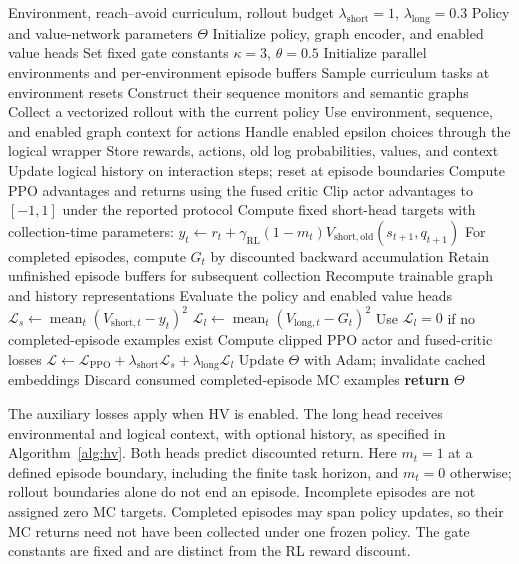 \documentclass[journal]{IEEEtran}
\begin{document}
\begin{algorithm}[t]
\caption{HiLTL Training with TD/MC Value Supervision}
\label{alg:training}
\begin{algorithmic}[1]
\REQUIRE Environment, reach--avoid curriculum, rollout budget
\REQUIRE $\lambda_{\mathrm{short}}=1$, $\lambda_{\mathrm{long}}=0.3$
\ENSURE Policy and value-network parameters $\Theta$
\STATE Initialize policy, graph encoder, and enabled value heads
\STATE Set fixed gate constants $\kappa=3$, $\theta=0.5$
\STATE Initialize parallel environments and per-environment episode buffers
 \STATE Sample curriculum tasks at environment resets
 \STATE Construct their sequence monitors and semantic graphs
 \STATE Collect a vectorized rollout with the current policy
 \STATE Use environment, sequence, and enabled graph context for actions
 \STATE Handle enabled epsilon choices through the logical wrapper
 \STATE Store rewards, actions, old log probabilities, values, and context
 \STATE Update logical history on interaction steps; reset at episode boundaries
 \STATE Compute PPO advantages and returns using the fused critic
 \STATE Clip actor advantages to $[-1,1]$ under the reported protocol
 \STATE Compute fixed short-head targets with collection-time parameters:
 \STATE $y_t\gets r_t+\gamma_{\mathrm{RL}}(1-m_t)V_{\mathrm{short,old}}(s_{t+1},q_{t+1})$
 \STATE For completed episodes, compute $G_t$ by discounted backward accumulation
 \STATE Retain unfinished episode buffers for subsequent collection
  \STATE Recompute trainable graph and history representations
  \STATE Evaluate the policy and enabled value heads
  \STATE $\mathcal L_s\gets\operatorname{mean}_t(V_{\mathrm{short},t}-y_t)^2$
  \STATE $\mathcal L_l\gets\operatorname{mean}_t(V_{\mathrm{long},t}-G_t)^2$
  \STATE Use $\mathcal L_l=0$ if no completed-episode examples exist
  \STATE Compute clipped PPO actor and fused-critic losses
  \STATE $\mathcal L\gets\mathcal L_{\mathrm{PPO}}+\lambda_{\mathrm{short}}\mathcal L_s+\lambda_{\mathrm{long}}\mathcal L_l$
  \STATE Update $\Theta$ with Adam; invalidate cached embeddings
 \ENDFOR
 \STATE Discard consumed completed-episode MC examples
\ENDWHILE
\STATE \textbf{return} $\Theta$
\end{algorithmic}
\end{algorithm}

The auxiliary losses apply when HV is enabled. The long head receives environmental and logical context, with optional history, as specified in Algorithm~\ref{alg:hv}. Both heads predict discounted return. Here $m_t=1$ at a defined episode boundary, including the finite task horizon, and $m_t=0$ otherwise; rollout boundaries alone do not end an episode. Incomplete episodes are not assigned zero MC targets. Completed episodes may span policy updates, so their MC returns need not have been collected under one frozen policy. The gate constants are fixed and are distinct from the RL reward discount.
\end{document}
